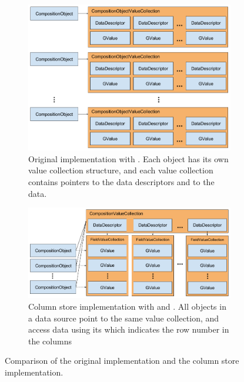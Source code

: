 \begin{figure}
    \centering
    \begin{subfigure}{1.0\textwidth}
        \includegraphics[width=\textwidth]{img/gap-original-rows.png}
        \caption{Original implementation with . Each object has its own value collection structure, and each value collection contains pointers to the data descriptors and to the data.}
        \label{fig:gap-original-rows}
    \end{subfigure}
    \begin{subfigure}{1.0\textwidth}
        \includegraphics[width=\textwidth]{img/gap-bb-columns.png}
        \caption{Column store implementation with  and . All objects in a data source point to the same value collection, and access data using its  which indicates the row number in the columns}
        \label{fig:gap-bb-columns}
    \end{subfigure}
    \caption{Comparison of the original implementation and the column store implementation.}
    \label{fig:gap-storage-comparison}
\end{figure}
